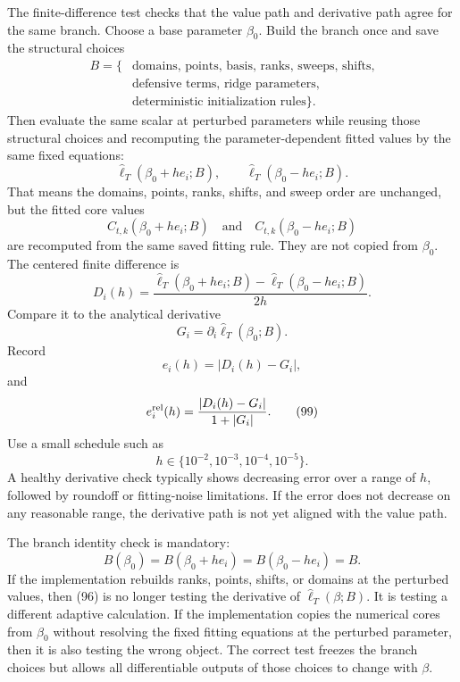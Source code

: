 \documentclass[11pt]{article}
\theoremstyle{remark}
\newcommand{\widehatell}{\widehat\ell}
\begin{document}
The finite-difference test checks that the value path and derivative path agree
for the same branch.  Choose a base parameter \(\beta_0\).  Build the branch
once and save the structural choices
\[
    \begin{aligned}
    B=\{&
    \text{domains, points, basis, ranks, sweeps, shifts,}\\
    &\text{defensive terms, ridge parameters,}\\
    &\text{deterministic initialization rules}\}.
    \end{aligned}
    \tag{94}
\]
Then evaluate the same scalar at perturbed parameters while reusing those
structural choices and recomputing the parameter-dependent fitted values by the
same fixed equations:
\[
    \widehatell_T(\beta_0+h e_i;B),
    \qquad
    \widehatell_T(\beta_0-h e_i;B).
    \tag{95}
\]
That means the domains, points, ranks, shifts, and sweep order are unchanged,
but the fitted core values
\[
    C_{t,k}(\beta_0+h e_i;B)
    \quad\text{and}\quad
    C_{t,k}(\beta_0-h e_i;B)
    \tag{95a}
\]
are recomputed from the same saved fitting rule.  They are not copied from
\(\beta_0\).
The centered finite difference is
\[
    D_i(h)
    =
    \frac{
    \widehatell_T(\beta_0+h e_i;B)
    -
    \widehatell_T(\beta_0-h e_i;B)}
    {2h}.
    \tag{96}
\]
Compare it to the analytical derivative
\[
    G_i=\partial_i\widehatell_T(\beta_0;B).
    \tag{97}
\]
Record
\[
    e_i(h)=|D_i(h)-G_i|,
    \tag{98}
\]
and
\[
    e_i^{\rm rel}(h)
    =
    \frac{|D_i(h)-G_i|}{1+|G_i|}.
    \tag{99}
\]
Use a small schedule such as
\[
    h\in\{10^{-2},10^{-3},10^{-4},10^{-5}\}.
    \tag{100}
\]
A healthy derivative check typically shows decreasing error over a range of
\(h\), followed by roundoff or fitting-noise limitations.  If the error does
not decrease on any reasonable range, the derivative path is not yet aligned
with the value path.

The branch identity check is mandatory:
\[
    B(\beta_0)=B(\beta_0+h e_i)=B(\beta_0-h e_i)=B.
    \tag{101}
\]
If the implementation rebuilds ranks, points, shifts, or domains at the
perturbed values, then (96) is no longer testing the derivative of
\(\widehatell_T(\beta;B)\).  It is testing a different adaptive calculation.
If the implementation copies the numerical cores from \(\beta_0\) without
resolving the fixed fitting equations at the perturbed parameter, then it is
also testing the wrong object.  The correct test freezes the branch choices but
allows all differentiable outputs of those choices to change with \(\beta\).
\end{document}
